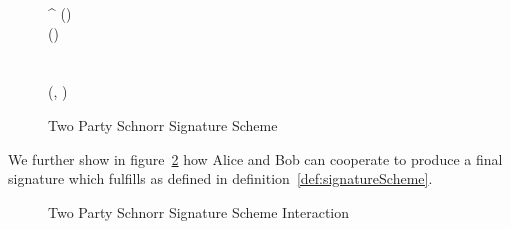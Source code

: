 \begin{figure}
\begin{center}
{\begin{varwidth}{\textwidth}
{            \pcreturn \funGen{\varSBob} \opEq \varRandBob^{\varSchnorrChallenge} \opAddPoint \varPubKeyBob
            }
            \procedure[linenumbering]{$\procFinSig{\varSigAlice}{\varSigBob}$} {
            (\varSAlice \opSeperate \varRandAlice \opSeperate \varRandBob) \opFunResult \varSigAlice \\
            (\varSBob \opSeperate \varRandAlice \opSeperate \varRandBob) \opFunResult \varSigBob \\
            \varRand \opAssign \varRandAlice \opAddPoint \varRandBob \\
            \varS \opAssign \varSAlice \opAddScalar \varSBob \\
            \varSigFin \opAssign (\varS, \varRand) \\
            \pcreturn \varSigFin
            }
        \end{varwidth}
        }
    \end{center}
    \caption{Two Party Schnorr Signature Scheme}
    \label{fig:twoparty-schnorr}
\end{figure}

We further show in figure~\ref{fig:twoparty-schnorr-prot} how Alice and Bob can cooperate to produce a final signature which fulfills \cnstCorrectness as defined in definition~\ref{def:signatureScheme}.

\begin{figure}
    \centering
    \caption{Two Party Schnorr Signature Scheme Interaction}
    \label{fig:twoparty-schnorr-prot}
\end{figure}

